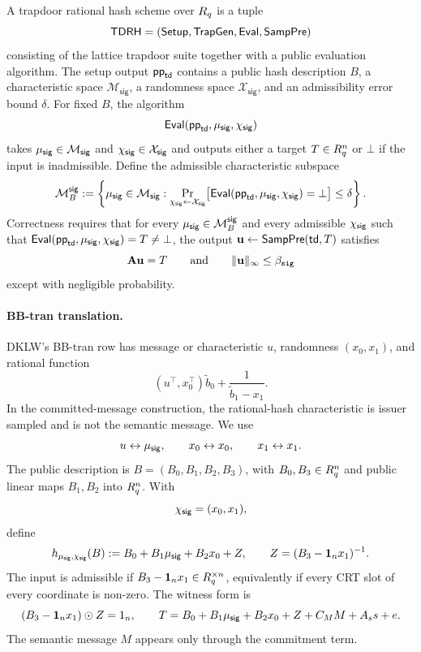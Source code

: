 \begin{definition}\label{def:trapdoor-rational-hash}
A trapdoor rational hash scheme over \(R_q\) is a tuple
\[
  \mathsf{TDRH}=(\mathsf{Setup},\mathsf{TrapGen},\mathsf{Eval},\mathsf{SampPre})
\]
consisting of the lattice trapdoor suite together with a public evaluation algorithm.  The setup output
\(\mathsf{pp}_{\mathsf{td}}\) contains a public hash description \(B\), a characteristic space
\(\mathcal M_{\mathsf{sig}}\), a randomness space \(\mathcal X_{\mathsf{sig}}\), and an admissibility error bound
\(\delta\).  For fixed \(B\), the algorithm
\[
  \mathsf{Eval}(\mathsf{pp}_{\mathsf{td}},\mu_{\mathsf{sig}},\chi_{\mathsf{sig}})
\]
takes \(\mu_{\mathsf{sig}}\in\mathcal M_{\mathsf{sig}}\) and \(\chi_{\mathsf{sig}}\in\mathcal X_{\mathsf{sig}}\) and outputs either a
target \(T\in R_q^n\) or \(\bot\) if the input is inadmissible.  Define the admissible characteristic subspace
\[
  \mathcal M^{\mathsf{sig}}_B:=
  \left\{
    \mu_{\mathsf{sig}}\in\mathcal M_{\mathsf{sig}}:
    \Pr_{\chi_{\mathsf{sig}}\gets\mathcal X_{\mathsf{sig}}}
    \bigl[\mathsf{Eval}(\mathsf{pp}_{\mathsf{td}},\mu_{\mathsf{sig}},\chi_{\mathsf{sig}})=\bot\bigr]
    \le \delta
  \right\}.
\]
Correctness requires that for every \(\mu_{\mathsf{sig}}\in\mathcal M^{\mathsf{sig}}_B\) and every admissible
\(\chi_{\mathsf{sig}}\) such that \(\mathsf{Eval}(\mathsf{pp}_{\mathsf{td}},\mu_{\mathsf{sig}},\chi_{\mathsf{sig}})=T\neq\bot\), the output
\(\mathbf{u}\gets\mathsf{SampPre}(\mathsf{td},T)\) satisfies
\[
  \mathbf{A}\mathbf{u}=T
  \qquad\text{and}\qquad
  \|\mathbf{u}\|_\infty\le \beta_{\mathtt{sig}}
\]
except with negligible probability.
\end{definition}

\paragraph{BB-tran translation.}
DKLW's BB-tran row has message or characteristic \(u\), randomness \((x_0,x_1)\), and rational function
\[
  (u^\top,x_0^\top)\tilde b_0+\frac{1}{\tilde b_1-x_1}.
\]
In the committed-message construction, the rational-hash characteristic is issuer sampled and is not the semantic
message.  We use
\[
  u\leftrightarrow \mu_{\mathsf{sig}},
  \qquad
  x_0\leftrightarrow x_0,
  \qquad
  x_1\leftrightarrow x_1.
\]
The public description is \(B=(B_0,B_1,B_2,B_3)\), with \(B_0,B_3\in R_q^n\) and public linear maps
\(B_1,B_2\) into \(R_q^n\).  With
\[
  \chi_{\mathsf{sig}}=(x_0,x_1),
\]
define
\begin{equation}
  h_{\mu_{\mathsf{sig}},\chi_{\mathsf{sig}}}(B):=B_0+B_1\mu_{\mathsf{sig}}+B_2x_0+Z,
  \qquad
  Z=(B_3-\mathbf 1_nx_1)^{-1}.
  \label{eq:htran-target}
\end{equation}
The input is admissible if \(B_3-\mathbf 1_nx_1\in R_q^{\times n}\), equivalently if every CRT slot of every
coordinate is non-zero.  The witness form is
\begin{equation}
  (B_3-\mathbf 1_nx_1)\odot Z=1_n,
  \qquad
  T=B_0+B_1\mu_{\mathsf{sig}}+B_2x_0+Z+C_MM+A_s s+e.
  \label{eq:htran-witness-form}
\end{equation}
The semantic message \(M\) appears only through the commitment term.

